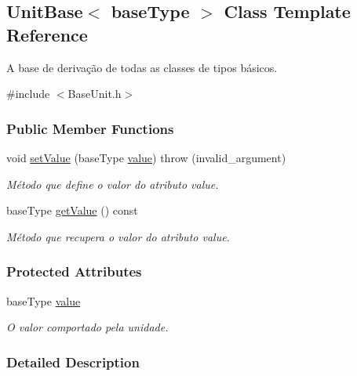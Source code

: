 \hypertarget{classUnitBase}{\subsection{Unit\-Base$<$ base\-Type $>$ Class Template Reference}
\label{d5/db5/classUnitBase}
}


A base de derivação de todas as classes de tipos básicos.  




{\ttfamily \#include $<$Base\-Unit.\-h$>$}

\subsubsection*{Public Member Functions}
\begin{DoxyCompactItemize}
\item 
void \hyperlink{classUnitBase_a9cd392786b8078ab713045a8d1dece52}{set\-Value} (base\-Type \hyperlink{classUnitBase_a1c1ad08b45f07a94e5cf71dee734436b}{value})  throw (invalid\-\_\-argument)
\begin{DoxyCompactList}\small\item\em Método que define o valor do atributo value. \end{DoxyCompactList}\item 
base\-Type \hyperlink{classUnitBase_a6b4041c7176acb6c4956e085603449d1}{get\-Value} () const 
\begin{DoxyCompactList}\small\item\em Método que recupera o valor do atributo value. \end{DoxyCompactList}\end{DoxyCompactItemize}
\subsubsection*{Protected Attributes}
\begin{DoxyCompactItemize}
\item 
base\-Type \hyperlink{classUnitBase_a1c1ad08b45f07a94e5cf71dee734436b}{value}
\begin{DoxyCompactList}\small\item\em O valor comportado pela unidade. \end{DoxyCompactList}\end{DoxyCompactItemize}


\subsubsection{Detailed Description}
